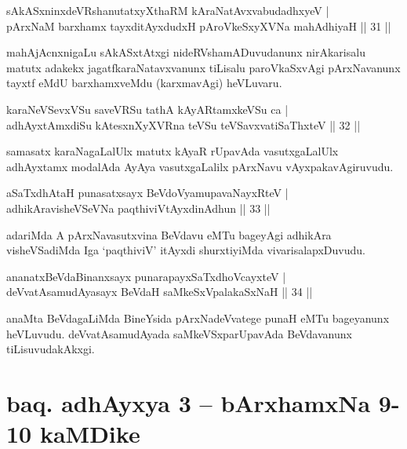 \begin{shl}
sAkASxninxdeVRshanutatxyXthaRM kAraNatAvxvabudadhxyeV |\\
pArxNaM barxhamx tayxditAyxdudxH pAroVkeSxyXVNa mahAdhiyaH \hfill || 31 ||
\end{shl}

\begin{artha}
mahAjAcnxnigaLu sAkASxtAtxgi nideRVshamADuvudanunx nirAkarisalu matutx adakekx jagatfkaraNatavxvanunx tiLisalu paroVkaSxvAgi pArxNavanunx tayxtf eMdU barxhamxveMdu (karxmavAgi) heVLuvaru.
\end{artha}

\begin{shl}
karaNeVSevxVSu saveVRSu tathA kAyARtamxkeVSu ca |\\
adhAyxtAmxdiSu kAtesxnXyXVRna teVSu teVSavxvatiSaThxteV \hfill || 32 ||
\end{shl}

\begin{artha}
samasatx karaNagaLalUlx matutx kAyaR rUpavAda vasutxgaLalUlx adhAyxtamx modalAda AyAya vasutxgaLalilx pArxNavu vAyxpakavAgiruvudu.
\end{artha}


\begin{shl}
aSaTxdhA\s taH punasatxsayx BeVdoV\s yamupavaNayxRteV |\\
adhikAravisheVSeVNa paqthiviVtAyxdinA\s dhun \hfill || 33 ||
\end{shl}

\begin{artha}
adariMda A pArxNavasutxvina BeVdavu eMTu bageyAgi adhikAra visheVSadiMda Iga `paqthiviV' itAyxdi shurxtiyiMda vivarisalapxDuvudu.
\end{artha}

\begin{shl}
ananatxBeVdaBinanxsayx punarapayxSaTxdhoVcayxteV |\\
deVvatAsamudAyasayx BeVdaH saMkeSxVpalakaSxNaH \hfill || 34 ||
\end{shl}

\begin{artha}
anaMta BeVdagaLiMda BineYsida pArxNadeVvatege punaH eMTu bageyanunx heVLu\-vudu. deVvatAsamudAyada saMkeVSxparUpavAda BeVdavanunx tiLisuvudakAkxgi.
\end{artha}

\section*{baq. adhAyxya 3 -- bArxhamxNa 9-10 kaMDike}

